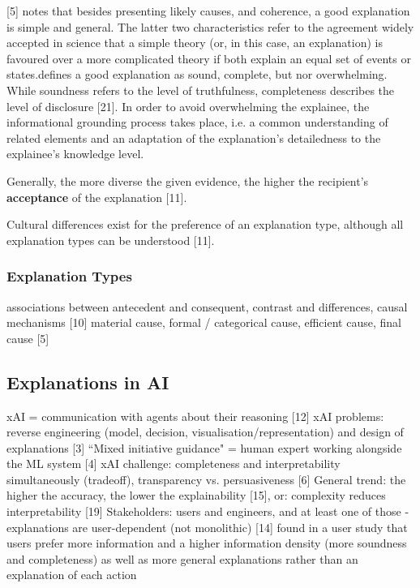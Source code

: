 [5] notes that besides presenting likely causes, and coherence, a good explanation is simple and general. The latter two characteristics refer to the agreement widely accepted in science that a simple theory (or, in this case, an explanation) is favoured over a more complicated theory if both explain an equal set of events or states.\newline
[21] defines a good explanation as sound, complete, but nor overwhelming. While soundness refers to the level of truthfulness, completeness describes the level of disclosure [21]. In order to avoid overwhelming the explainee, the informational grounding process takes place, i.e. a common understanding of related elements and an adaptation of the explanation's detailedness to the explainee's knowledge level.\newline

Generally, the more diverse the given evidence, the higher the recipient's \textbf{acceptance} of the explanation [11].\newline

Cultural differences exist for the preference of an explanation type, although all explanation types can be understood [11].\newline


\subsubsection{Explanation Types}
associations between antecedent and consequent, contrast and differences, causal mechanisms [10] \newline
material cause, formal / categorical cause, efficient cause, final cause [5] \newline




\subsection{Explanations in AI}
xAI = communication with agents about their reasoning [12] \newline
xAI problems: reverse engineering (model, decision, visualisation/representation) and design of explanations [3] \newline
``Mixed initiative guidance" = human expert working alongside the ML system [4] \newline
xAI challenge: completeness and interpretability simultaneously (tradeoff), transparency vs. persuasiveness [6] \newline
General trend: the higher the accuracy, the lower the explainability [15], or: complexity reduces interpretability [19] \newline
Stakeholders: users and engineers, and at least one of those - explanations are user-dependent (not monolithic) [14] \newline
[17] found in a user study that users prefer more information and a higher information density (more soundness and completeness) as well as more general explanations rather than an explanation of each action\newline

